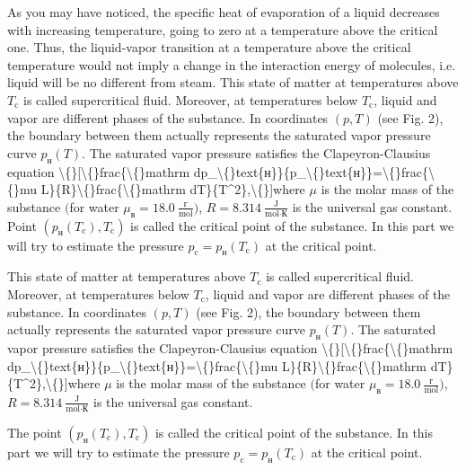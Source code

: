 \documentclass[11pt,a4paper]{article}
\begin{document}
As you may have noticed, the specific heat of evaporation of a liquid decreases with increasing temperature, going to zero at a temperature above the critical one. Thus, the liquid-vapor transition at a temperature above the critical temperature would not imply a change in the interaction energy of molecules, i.e. liquid will be no different from steam. This state of matter at temperatures above $T_\mathrm c$ is called supercritical fluid. Moreover, at temperatures below $T_\mathrm c$, liquid and vapor are different phases of the substance. In coordinates $(p,T)$ (see Fig. 2), the boundary between them actually represents the saturated vapor pressure curve $p_\text{н}(T)$. The saturated vapor pressure satisfies the Clapeyron-Clausius equation \textbackslash\{\}[\textbackslash\{\}frac\{\textbackslash\{\}mathrm dp_\textbackslash\{\}text\{н\}\}\{p_\textbackslash\{\}text\{н\}\}=\textbackslash\{\}frac\{\textbackslash\{\}mu L\}\{R\}\textbackslash\{\}frac\{\textbackslash\{\}mathrm dT\}\{T^2\},\textbackslash\{\}]where $\mu$ is the molar mass of the substance $\big($for water $\mu_\text{в}=18.0~\frac{\text{г}}{\text{mol}}\Big)$, $R=8.314~\frac{\text{J}}{\text{mol}\cdot\text{К}}$ is the universal gas constant. Point $(p_\text{н}(T_\mathrm c),T_\mathrm c)$ is called the critical point of the substance. In this part we will try to estimate the pressure $p_\mathrm c=p_\text{н}(T_\mathrm c)$ at the critical point.

This state of matter at temperatures above $T_\mathrm c$ is called supercritical fluid. Moreover, at temperatures below $T_\mathrm c$, liquid and vapor are different phases of the substance. In coordinates $(p,T)$ (see Fig. 2), the boundary between them actually represents the saturated vapor pressure curve $p_\text{н}(T)$. The saturated vapor pressure satisfies the Clapeyron-Clausius equation \textbackslash\{\}[\textbackslash\{\}frac\{\textbackslash\{\}mathrm dp_\textbackslash\{\}text\{н\}\}\{p_\textbackslash\{\}text\{н\}\}=\textbackslash\{\}frac\{\textbackslash\{\}mu L\}\{R\}\textbackslash\{\}frac\{\textbackslash\{\}mathrm dT\}\{T^2\},\textbackslash\{\}]where $\mu$ is the molar mass of the substance $\big($for water $\mu_\text{в}=18.0~\frac{\text{г}}{\text{mol}}\Big)$, $R=8.314~\frac{\text{J}}{\text{mol}\cdot\text{К}}$ is the universal gas constant.

The point $(p_\text{н}(T_\mathrm c),T_\mathrm c)$ is called the critical point of the substance. In this part we will try to estimate the pressure $p_\mathrm c=p_\text{н}(T_\mathrm c)$ at the critical point.
\end{document}
